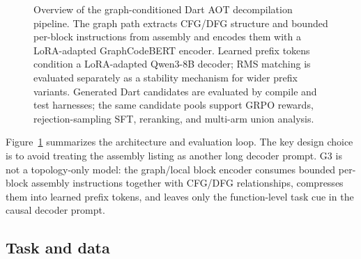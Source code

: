 \documentclass[11pt]{article}
\begin{document}
\begin{figure}[t]
{%
}
\caption{Overview of the graph-conditioned Dart AOT decompilation pipeline. The graph path extracts CFG/DFG structure and bounded per-block instructions from assembly and encodes them with a LoRA-adapted GraphCodeBERT encoder. Learned prefix tokens condition a LoRA-adapted Qwen3-8B decoder; RMS matching is evaluated separately as a stability mechanism for wider prefix variants. Generated Dart candidates are evaluated by compile and test harnesses; the same candidate pools support GRPO rewards, rejection-sampling SFT, reranking, and multi-arm union analysis.}
\label{fig:architecture}
\end{figure}

Figure~\ref{fig:architecture} summarizes the architecture and evaluation loop. The key design choice is to avoid treating the assembly listing as another long decoder prompt. G3 is not a topology-only model: the graph/local block encoder consumes bounded per-block assembly instructions together with CFG/DFG relationships, compresses them into learned prefix tokens, and leaves only the function-level task cue in the causal decoder prompt.

\subsection{Task and data}
\end{document}
